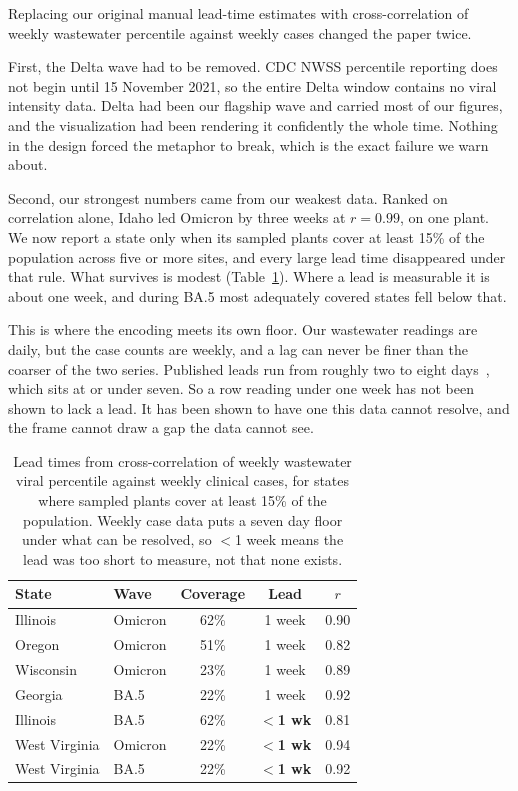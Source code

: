 \documentclass{vgtc}                %
\begin{document}
Replacing our original manual lead-time estimates with cross-correlation of weekly
wastewater percentile against weekly cases changed the paper twice.

First, the Delta wave had to be removed. CDC NWSS percentile reporting does not
begin until 15 November 2021, so the entire Delta window contains no viral
intensity data. Delta had been our flagship wave and carried most of our figures,
and the visualization had been rendering it confidently the whole time. Nothing in
the design forced the metaphor to break, which is the exact failure we warn about.

Second, our strongest numbers came from our weakest data. Ranked on correlation
alone, Idaho led Omicron by three weeks at $r = 0.99$, on one plant. We now report
a state only when its sampled plants cover at least 15\% of the population across
five or more sites, and every large lead time disappeared under that rule. What
survives is modest (Table~\ref{tab:leads}). Where a lead is measurable it is about
one week, and during BA.5 most adequately covered states fell below that.

This is where the encoding meets its own floor. Our wastewater readings are daily,
but the case counts are weekly, and a lag can never be finer than the coarser of
the two series. Published leads run from roughly two to eight
days~\cite{daoust2021,peccia2020}, which sits at or under seven. So a row reading
under one week has not been shown to lack a lead. It has been shown to have one
this data cannot resolve, and the frame cannot draw a gap the data cannot see.

\begin{table}[t]
  \centering
  \caption{Lead times from cross-correlation of weekly wastewater viral
  percentile against weekly clinical cases, for states where sampled plants cover
  at least 15\% of the population. Weekly case data puts a seven day floor under
  what can be resolved, so $<$1 week means the lead was too short to measure, not
  that none exists.}
  \label{tab:leads}
  \begin{tabular}{llccc}
    \toprule
    State & Wave & Coverage & Lead & $r$ \\
    \midrule
    Illinois      & Omicron & 62\% & 1 week           & 0.90 \\
    Oregon        & Omicron & 51\% & 1 week           & 0.82 \\
    Wisconsin     & Omicron & 23\% & 1 week           & 0.89 \\
    Georgia       & BA.5    & 22\% & 1 week           & 0.92 \\
    Illinois      & BA.5    & 62\% & \textbf{$<$1 wk} & 0.81 \\
    West Virginia & Omicron & 22\% & \textbf{$<$1 wk} & 0.94 \\
    West Virginia & BA.5    & 22\% & \textbf{$<$1 wk} & 0.92 \\
    \bottomrule
  \end{tabular}
\end{table}
\end{document}
